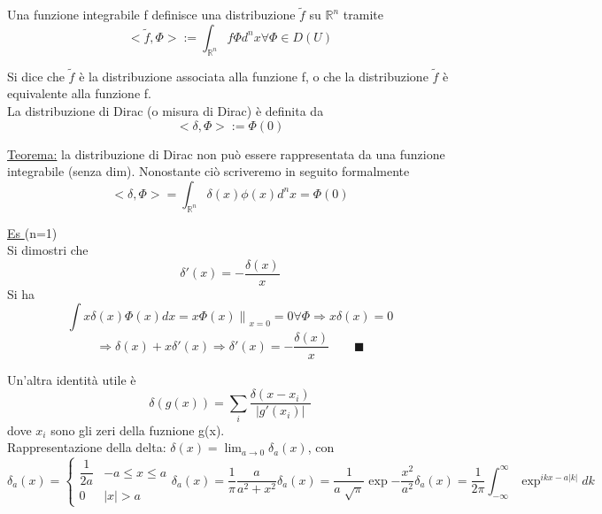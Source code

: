 \documentclass[a4paper,11pt]{report}
\newcommand{\Rn}{\mathbb{R}^n}
\begin{document}
Una funzione integrabile f definisce una distribuzione $\tilde{f}$ su $\mathbb{R}^n$ tramite
\begin{equation}
<\tilde{f},\Phi> := \int_{\Rn} f \Phi d^{n}x
\forall \Phi \in D(U) 
\end{equation}


Si dice che $\tilde{f}$ è la distribuzione associata alla funzione f, o che la distribuzione $\tilde{f}$ è equivalente alla funzione f.\\
La distribuzione di Dirac (o misura di Dirac) è definita da 
\begin{equation}
<\delta,\Phi> := \Phi(0) 
\end{equation}

\underline{Teorema:} la distribuzione di Dirac non può essere rappresentata da una funzione integrabile (senza dim). Nonostante ciò scriveremo in seguito formalmente
\begin{equation}
<\delta , \Phi> = \int_{\Rn} \delta (x) \phi(x) d^n x= \Phi(0) 
\end{equation}

\underline{Es } (n=1)\\
Si dimostri che 
\begin{equation}
\delta' (x) =-\dfrac{\delta(x)}{x}
\end{equation}
Si ha $$\int x\delta(x)\Phi(x)dx = \left.x\Phi(x)\right\|_{x=0}=0 \forall \Phi \Rightarrow x\delta(x)=0 $$
$$\Rightarrow \delta(x) + x\delta ' (x) \Rightarrow \delta ' (x) = -\dfrac{\delta(x)}{x}  \qquad \blacksquare$$

Un'altra identità utile è
\begin{equation}
\delta(g(x)) = \sum_{i}\dfrac{\delta(x-x_i)}{|g'(x_i)|} 
\end{equation} 
dove $x_i$ sono gli zeri della fuznione g(x).\\
Rappresentazione della delta: $\delta(x) = \lim_{a\to 0} \delta_a(x)$, con 
\begin{subequations}
\begin{equation}
\delta_a(x)=\left\{\begin{matrix}
\dfrac{1}{2a} & -a \leq x \leq a \\
0 & |x| > a
\end{matrix}\right.
\end{equation}
\begin{equation}
\delta_a(x) = \dfrac{1}{\pi}\dfrac{a}{a^2+x^2}
\end{equation}
\begin{equation}
\delta_a(x) = \dfrac{1}{a\sqrt[]{\pi}}\exp{-\dfrac{x^2}{a^2}}
\end{equation}
\begin{equation}
\delta_a(x) = \dfrac{1}{2\pi} \int_{-\infty}^{\infty}\exp^{ikx-a|k|}dk
\end{equation}
\end{subequations}
\end{document}
